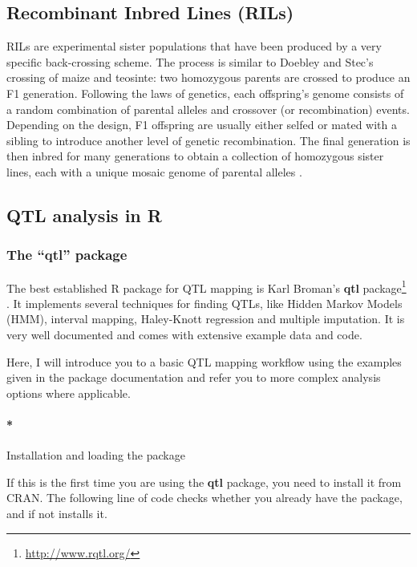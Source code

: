 \documentclass[12pt,]{krantz}
\let\oldparagraph\paragraph
\renewcommand{\paragraph}[1]{\oldparagraph{#1}\mbox{}}
\renewcommand{\href}[2]{#2\footnote{\url{#1}}}
\begin{document}
\subsection{Recombinant Inbred Lines
(RILs)}\label{recombinant-inbred-lines-rils}

RILs are experimental sister populations that have been produced by a
very specific back-crossing scheme. The process is similar to Doebley
and Stec's crossing of maize and teosinte: two homozygous parents are
crossed to produce an F1 generation. Following the laws of genetics,
each offspring's genome consists of a random combination of parental
alleles and crossover (or recombination) events. Depending on the
design, F1 offspring are usually either selfed or mated with a sibling
to introduce another level of genetic recombination. The final
generation is then inbred for many generations to obtain a collection of
homozygous sister lines, each with a unique mosaic genome of parental
alleles \citep{Pollard2012}.

\subsection{QTL analysis in R}\label{qtl-analysis-in-r}

\subsubsection{\texorpdfstring{The ``qtl''
package}{The qtl package}}\label{the-qtl-package}

The best established R package for QTL mapping is Karl Broman's
\href{http://www.rqtl.org/}{\textbf{qtl} package} \citep{R-qtl}. It
implements several techniques for finding QTLs, like Hidden Markov
Models (HMM), interval mapping, Haley-Knott regression and multiple
imputation. It is very well documented and comes with extensive example
data and code.

Here, I will introduce you to a basic QTL mapping workflow using the
examples given in the package documentation and refer you to more
complex analysis options where applicable.

\paragraph*{Installation and loading the
package}\label{installation-and-loading-the-package}

If this is the first time you are using the \textbf{qtl} package, you
need to install it from CRAN. The following line of code checks whether
you already have the package, and if not installs it.
\end{document}
